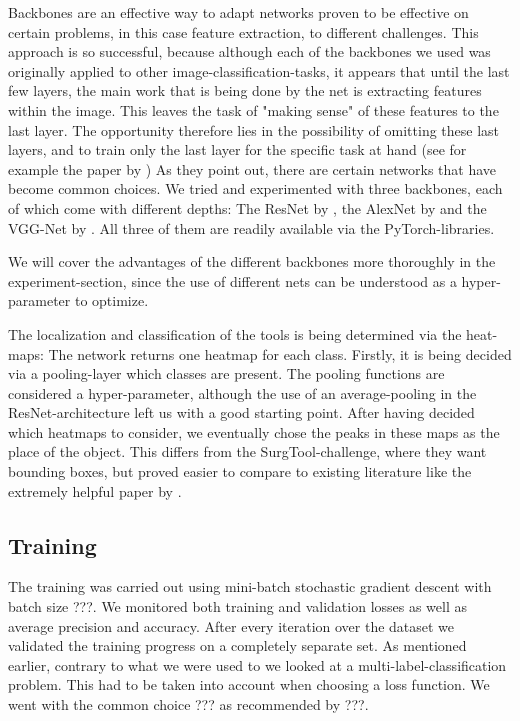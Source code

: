 Backbones are an effective way to adapt networks proven to be effective on certain problems, in this case feature extraction, to different challenges. This approach is so successful, because although each of the backbones we used was originally applied to other image-classification-tasks, it appears that until the last few layers, the main work that is being done by the net is extracting features within the image. This leaves the task of "making sense" of these features to the last layer. The opportunity therefore lies in the possibility of omitting these last layers, and to train only the last layer for the specific task at hand (see for example the paper by \cite{https://doi.org/10.48550/arxiv.2206.08016}) As they point out, there are certain networks that have become common choices.
We tried and experimented with three backbones, each of which come with different depths: The ResNet by \cite{https://doi.org/10.48550/arxiv.1512.03385}, the AlexNet by \cite{krizhevsky2017imagenet} and the VGG-Net by \cite{https://doi.org/10.48550/arxiv.1409.1556}.
All three of them are readily available via the PyTorch-libraries.

We will cover the advantages of the different backbones more thoroughly in the experiment-section, since the use of different nets can be understood as a hyper-parameter to optimize.

The localization and classification of the tools is being determined via the heat-maps: The network returns one heatmap for each class. Firstly, it is being decided via a pooling-layer which classes are present. The pooling functions are considered a hyper-parameter, although the use of an average-pooling in the ResNet-architecture left us with a good starting point. After having decided which heatmaps to consider, we eventually chose the peaks in these maps as the place of the object. This differs from the SurgTool-challenge, where they want bounding boxes, but proved easier to compare to existing literature like the extremely helpful paper by \cite{Vardazaryan}.

\subsection{Training}

The training was carried out using mini-batch stochastic gradient descent with batch size ???. We monitored both training and validation losses as well as average precision and accuracy.  After every iteration over the dataset we validated the training progress on a completely separate set.
As mentioned earlier, contrary to what we were used to we looked at a multi-label-classification problem. This had to be taken into account when choosing a loss function. We went with the common choice ??? as recommended by  ???.

